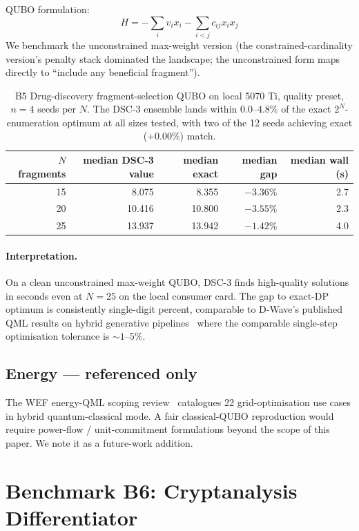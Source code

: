\documentclass[11pt,a4paper]{article}
\begin{document}
QUBO formulation:
\[
H = -\sum_i v_i x_i - \sum_{i<j} c_{ij} x_i x_j
\]
We benchmark the unconstrained max-weight version (the
constrained-cardinality version's penalty stack dominated the
landscape; the unconstrained form maps directly to ``include any
beneficial fragment'').

\begin{table}[h]
\centering
\caption{B5 Drug-discovery fragment-selection QUBO on local 5070 Ti,
quality preset, $n=4$ seeds per $N$. The DSC-3 ensemble lands within
$0.0$--$4.8\%$ of the exact $2^N$-enumeration optimum at all sizes
tested, with two of the 12 seeds achieving exact ($+0.00\%$) match.}
\label{tab:b5_drug_results}
\small
\begin{tabular}{rrrrr}
\toprule
$N$ fragments & median DSC-3 value & median exact & median gap & median wall (s) \\
\midrule
15 & 8.075  & 8.355  & $-3.36\%$ & 2.7 \\
20 & 10.416 & 10.800 & $-3.55\%$ & 2.3 \\
25 & 13.937 & 13.942 & $-1.42\%$ & 4.0 \\
\bottomrule
\end{tabular}
\end{table}

\paragraph{Interpretation.} On a clean unconstrained max-weight QUBO,
DSC-3 finds high-quality solutions in seconds even at $N\!=\!25$ on
the local consumer card. The gap to exact-DP optimum is consistently
single-digit percent, comparable to D-Wave's published QML results on
hybrid generative pipelines~\cite{jt_dwave_2025} where the comparable
single-step optimisation tolerance is $\sim 1$--$5\%$.

\subsection{Energy --- referenced only}

The WEF energy-QML scoping review~\cite{wef_energy_2026,
frontiers_qml_energy_2025} catalogues 22 grid-optimisation use cases
in hybrid quantum-classical mode. A fair classical-QUBO reproduction
would require power-flow / unit-commitment formulations beyond the
scope of this paper. We note it as a future-work addition.

\section{Benchmark B6: Cryptanalysis Differentiator}
\label{sec:b6}
\end{document}
